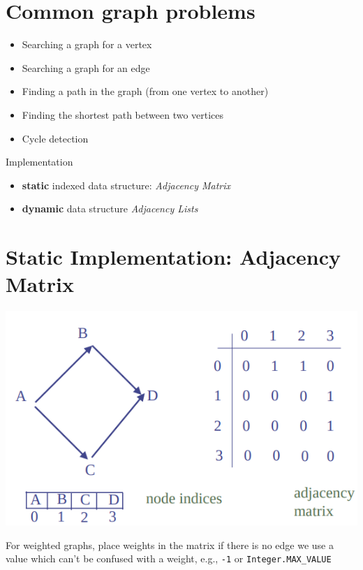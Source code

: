 \documentclass{article}
\newcommand{\inlinecode}[2]{\colorbox{lightgray}{\lstinline
[language=#1]$#2$}}
\begin{document}
\section{Common graph problems}
\begin{itemize}
	\item Searching a graph for a vertex
	\item Searching a graph for an edge
	\item Finding a path in the graph (from one vertex to another)
	\item Finding the shortest path between two vertices
	\item Cycle detection
\end{itemize}
Implementation
\begin{itemize}
	\item \textbf{static} indexed data structure: \textit{Adjacency Matrix}
	\item \textbf{dynamic} data structure \textit{Adjacency Lists}
\end{itemize}

\section{Static Implementation: Adjacency Matrix}
\begin{center}
	\includegraphics[scale=0.5]{adjacency_matrix.png}
\end{center}
\begin{flushleft}
For weighted graphs, place weights in the matrix if there is no edge we use a value which can’t be confused with a weight, e.g., \texttt{-1} or \verb!Integer.MAX_VALUE!
\end{flushleft}
\end{document}
